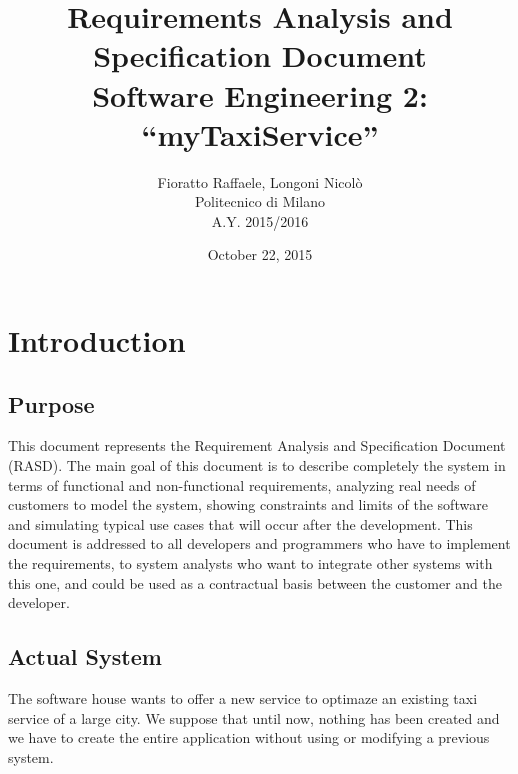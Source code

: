 \documentclass[a4paper,12pt]{article}%
\newcounter{func_req_counter}
\begin{document}
\begin{figure}
  \centering
	\def\svgwidth{\columnwidth}
    \resizebox{0.35\textwidth}{!}{}
\end{figure}
\title{{\Huge \textbf{R}equirements \textbf{A}nalysis and\\
\textbf{S}pecification \textbf{D}ocument}\\{\Large Software Engineering 2: ``myTaxiService''}}

\author{Fioratto Raffaele, Longoni Nicol\`{o}
\\Politecnico di Milano
\\{\small A.Y. 2015/2016}}
\date{October 22, 2015}
\maketitle
\newpage
\tableofcontents
\newpage
\section{Introduction}

\subsection{Purpose}
This document represents the Requirement Analysis and Specification Document
(RASD). The main goal of this document is to describe completely the system
in terms of functional and non-functional requirements, analyzing real needs
of customers to model the system, showing constraints and limits
of the software and simulating typical use cases that will occur after the
development. This document is addressed to all developers and programmers who
have to implement the requirements, to system analysts who want to integrate
other systems with this one, and could be used as a contractual basis between
the customer and the developer.

\subsection{Actual System}
The software house wants to offer a new service to optimaze an existing 
taxi service of a large city. We suppose that until now, nothing has been 
created and we have to create the entire application without using or modifying 
a previous system.
\end{document}
